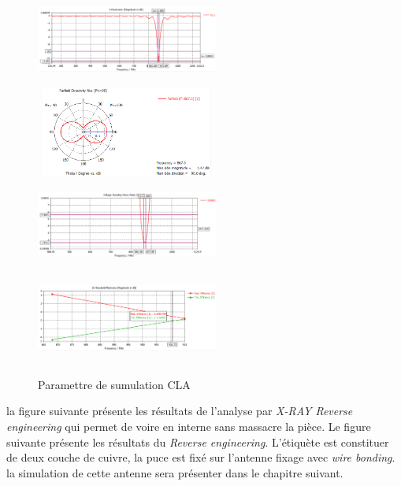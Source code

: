 \documentclass[11pt, a4paper, twoside]{book}
\begin{document}
\begin{figure}[H]
\centering
\includegraphics[width=6cm,height=3cm]{claaaass11}
\includegraphics[width=6cm,height=3cm]{claPattern}
\includegraphics[width=6cm,height=3cm]{claaavswr}
\includegraphics[width=6cm,height=3cm]{claefficency}
\caption{Paramettre de sumulation CLA}
\end{figure} 

la figure suivante présente les résultats de l'analyse par  \emph{X-RAY Reverse engineering} qui permet de voire en interne sans massacre la pièce. Le figure suivante présente les résultats du \emph{Reverse engineering}. L'étiquète est constituer de deux couche de cuivre, la puce est fixé sur l'antenne fixage avec \emph{wire bonding}. la simulation de cette antenne sera présenter dans le chapitre suivant. \\
\end{document}

